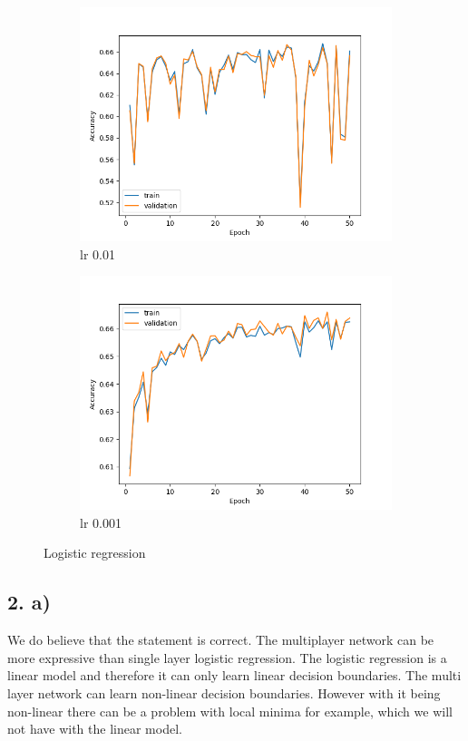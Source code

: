 \documentclass[11pt]{article}
\begin{document}
\begin{figure}
\centering
\begin{subfigure}{.5\textwidth}
  \centering
  \includegraphics[width=.9\linewidth]{./plots/logistic_regression_0.01.png}
  \caption{lr 0.01}
  \label{fig:sub1}
\end{subfigure}%
\begin{subfigure}{.5\textwidth}
  \centering
  \includegraphics[width=.9\linewidth]{./plots/logistic_regression_0.001.png}
  \caption{lr 0.001}
  \label{fig:sub2}
\end{subfigure}
\caption{Logistic regression}
\label{fig:logistic_regression}
\end{figure}

\subsection{2. a)}
We do believe that the statement is correct.
The multiplayer network can be more expressive than single layer logistic regression.
The logistic regression is a linear model and therefore it can only learn linear decision boundaries.
The multi layer network can learn non-linear decision boundaries.
However with it being non-linear there can be a problem with local minima for example, which we will not have with the linear model.
\end{document}
